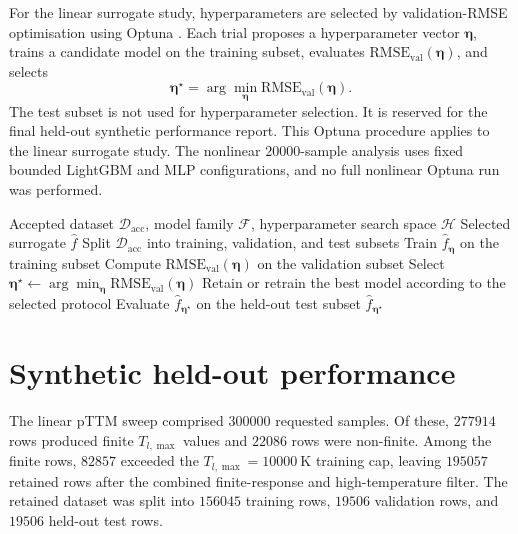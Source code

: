 For the linear surrogate study, hyperparameters are selected by validation-RMSE optimisation using Optuna \cite{akiba2019optuna}. Each trial proposes a hyperparameter vector $\boldsymbol{\eta}$, trains a candidate model on the training subset, evaluates $\mathrm{RMSE}_{\mathrm{val}}(\boldsymbol{\eta})$, and selects
\begin{equation}
    \boldsymbol{\eta}^{\star}
    =
    \arg\min_{\boldsymbol{\eta}}
    \mathrm{RMSE}_{\mathrm{val}}(\boldsymbol{\eta}).
\end{equation}
The test subset is not used for hyperparameter selection. It is reserved for the final held-out synthetic performance report. This Optuna procedure applies to the linear surrogate study. The nonlinear \(\num{20000}\)-sample analysis uses fixed bounded LightGBM and MLP configurations, and no full nonlinear Optuna run was performed.

\begin{algorithm}[htbp]
    \caption{Surrogate training and validation-based model selection}
    \label{alg:ch4-surrogate-training}
    \begin{algorithmic}[1]
        \Require Accepted dataset $\mathcal{D}_{\mathrm{acc}}$, model family $\mathcal{F}$, hyperparameter search space $\mathcal{H}$
        \Ensure Selected surrogate $\hat{f}$
        \State Split $\mathcal{D}_{\mathrm{acc}}$ into training, validation, and test subsets
        \State Train $\hat{f}_{\boldsymbol{\eta}}$ on the training subset
        \State Compute $\mathrm{RMSE}_{\mathrm{val}}(\boldsymbol{\eta})$ on the validation subset
        \EndFor
        \State Select $\boldsymbol{\eta}^{\star}\gets\arg\min_{\boldsymbol{\eta}}\mathrm{RMSE}_{\mathrm{val}}(\boldsymbol{\eta})$
        \State Retain or retrain the best model according to the selected protocol
        \State Evaluate $\hat{f}_{\boldsymbol{\eta}^{\star}}$ on the held-out test subset
        \State \Return $\hat{f}_{\boldsymbol{\eta}^{\star}}$
    \end{algorithmic}
\end{algorithm}

\section{Synthetic held-out performance}

The linear pTTM sweep comprised \(\num{300000}\) requested samples. Of these, \(\num{277914}\) rows produced finite $T_{l,\max}$ values and \(\num{22086}\) rows were non-finite. Among the finite rows, \(\num{82857}\) exceeded the $T_{l,\max}=\SI{10000}{\kelvin}$ training cap, leaving \(\num{195057}\) retained rows after the combined finite-response and high-temperature filter. The retained dataset was split into \(\num{156045}\) training rows, \(\num{19506}\) validation rows, and \(\num{19506}\) held-out test rows.

